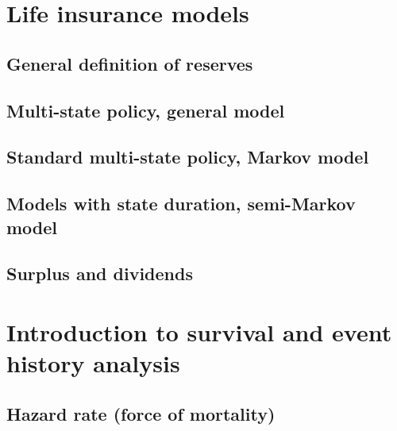 \documentclass[a4paper,12pt,openany]{book}
\begin{document}
\hypertarget{life-insurance-models}{%
\section{Life insurance models}\label{life-insurance-models}}

\hypertarget{general-definition-of-reserves}{%
\subsection{General definition of reserves}\label{general-definition-of-reserves}}

\hypertarget{multi-state-policy-general-model}{%
\subsection{Multi-state policy, general model}\label{multi-state-policy-general-model}}

\hypertarget{standard-multi-state-policy-markov-model}{%
\subsection{Standard multi-state policy, Markov model}\label{standard-multi-state-policy-markov-model}}

\hypertarget{models-with-state-duration-semi-markov-model}{%
\subsection{Models with state duration, semi-Markov model}\label{models-with-state-duration-semi-markov-model}}

\hypertarget{surplus-and-dividends}{%
\subsection{Surplus and dividends}\label{surplus-and-dividends}}

\hypertarget{introduction-to-survival-and-event-history-analysis}{%
\section{Introduction to survival and event history analysis}\label{introduction-to-survival-and-event-history-analysis}}

\hypertarget{hazard-rate-force-of-mortality}{%
\subsection{Hazard rate (force of mortality)}\label{hazard-rate-force-of-mortality}}
\end{document}
